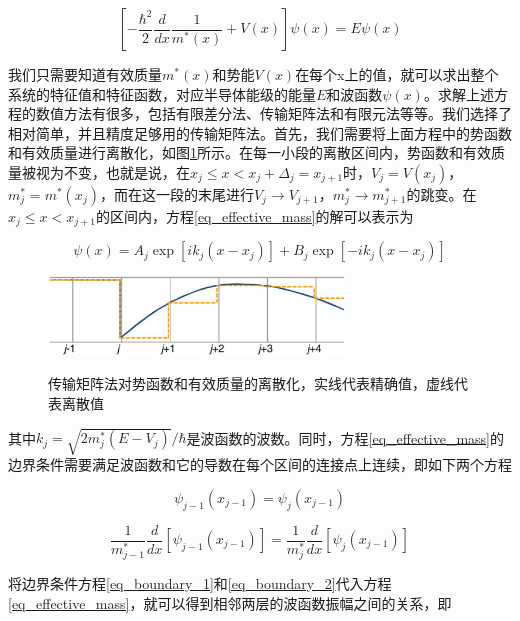 \documentclass{ZJUthesis}
\begin{document}
\begin{equation}
    \label{eq_effective_mass}
    \left[ -\frac{\hbar^2}{2} \frac{d}{dx} \frac{1}{m^*(x)} + V(x) \right] \psi(x) = E \psi(x)
\end{equation}

我们只需要知道有效质量$m^*(x)$和势能$V(x)$在每个x上的值，就可以求出整个系统的特征值和特征函数，对应半导体能级的能量$E$和波函数$\psi(x)$。求解上述方程的数值方法有很多，包括有限差分法、传输矩阵法和有限元法等等。我们选择了相对简单，并且精度足够用的传输矩阵法。首先，我们需要将上面方程中的势函数和有效质量进行离散化，如图\ref{fig_tmm}所示。在每一小段的离散区间内，势函数和有效质量被视为不变，也就是说，在$x_j\le x<x_j+\Delta_j=x_{j+1}$时，$V_j=V(x_j)$，$m^*_j=m^*(x_j)$，而在这一段的末尾进行$V_j\to V_{j+1}$，$m^*_j\to m^*_{j+1}$的跳变。在$x_j\le x<x_{j+1}$的区间内，方程\ref{eq_effective_mass}的解可以表示为

\begin{equation}
    \label{eq_effective_mass_solution}
    \psi(x) = A_j \exp [i k_j (x-x_j)] + B_j \exp [-i k_j (x-x_j)]
\end{equation}

\begin{figure}[!ht]
  \centering
  \includegraphics[width=0.7\textwidth]{./Pictures/tmm.eps}\\
  \caption{传输矩阵法对势函数和有效质量的离散化，实线代表精确值，虚线代表离散值}
  \label{fig_tmm}
\end{figure}

其中$k_j=\sqrt{2 m^*_j (E-V_j)} / \hbar$是波函数的波数。同时，方程\ref{eq_effective_mass}的边界条件需要满足波函数和它的导数在每个区间的连接点上连续，即如下两个方程

\begin{equation}
    \label{eq_boundary_1}
    \psi_{j-1}(x_{j-1}) = \psi_j(x_{j-1}) 
\end{equation}

\begin{equation}
    \label{eq_boundary_2}
    \frac{1}{m^*_{j-1}} \frac{d}{dx} [ \psi_{j-1}(x_{j-1}) ] = \frac{1}{m^*_j} \frac{d}{dx} [\psi_j(x_{j-1})]
\end{equation}

将边界条件方程\ref{eq_boundary_1}和\ref{eq_boundary_2}代入方程\ref{eq_effective_mass}，就可以得到相邻两层的波函数振幅之间的关系，即
\end{document}
